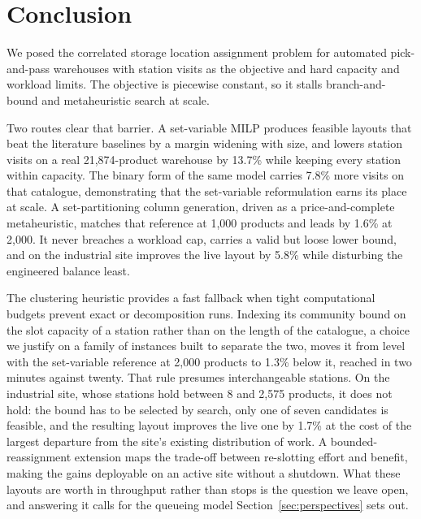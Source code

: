 \documentclass[]{interact}
\begin{document}
\section{Conclusion}\label{sec:conclusion}
We posed the correlated storage location assignment problem for automated pick-and-pass warehouses with station visits as the objective and hard capacity and workload limits. The objective is piecewise constant, so it stalls branch-and-bound and metaheuristic search at scale. 

Two routes clear that barrier. A set-variable MILP produces feasible layouts that beat the literature baselines by a margin widening with size, and lowers station visits on a real 21,874-product warehouse by 13.7\% while keeping every station within capacity. The binary form of the same model carries 7.8\% more visits on that catalogue, demonstrating that the set-variable reformulation earns its place at scale. A set-partitioning column generation, driven as a price-and-complete metaheuristic, matches that reference at 1,000 products and leads by 1.6\% at 2,000. It never breaches a workload cap, carries a valid but loose lower bound, and on the industrial site improves the live layout by 5.8\% while disturbing the engineered balance least. 

The clustering heuristic provides a fast fallback when tight computational budgets prevent exact or decomposition runs. Indexing its community bound on the slot capacity of a station rather than on the length of the catalogue, a choice we justify on a family of instances built to separate the two, moves it from level with the set-variable reference at 2,000 products to 1.3\% below it, reached in two minutes against twenty. That rule presumes interchangeable stations. On the industrial site, whose stations hold between 8 and 2,575 products, it does not hold: the bound has to be selected by search, only one of seven candidates is feasible, and the resulting layout improves the live one by 1.7\% at the cost of the largest departure from the site's existing distribution of work. A bounded-reassignment extension maps the trade-off between re-slotting effort and benefit, making the gains deployable on an active site without a shutdown. What these layouts are worth in throughput rather than stops is the question we leave open, and answering it calls for the queueing model Section~\ref{sec:perspectives} sets out.
\end{document}
